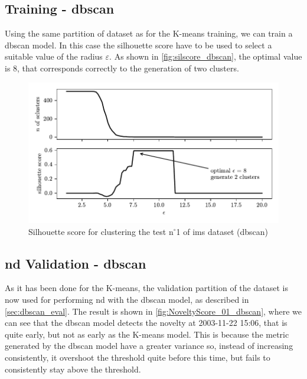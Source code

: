 \subsection{Training - \gls{dbscan}}
Using the same partition of dataset as for the K-means training, we can train a \gls{dbscan} model. In this case the silhouette score have to be used to select a suitable value of the radius $\varepsilon$. As shown in \autoref{fig:silscore_dbscan}, the optimal value is 8, that corresponds correctly to the generation of two clusters.

\begin{figure}
    \centering
    \includegraphics{images/IMS/InertiaScore_01_dbscan.pdf}
    \caption{Silhouette score for clustering the test $\text{n}^\circ$1 of \gls{ims} dataset (\gls{dbscan})}
    \label{fig:silscore_dbscan}
\end{figure}

\subsection{\gls{nd} Validation - \gls{dbscan}}
As it has been done for the K-means, the validation partition of the dataset is now used for performing \gls{nd} with the \gls{dbscan} model, as described in \autoref{sec:dbscan_eval}. The result is shown in \autoref{fig:NoveltyScore_01_dbscan}, where we can see that the \gls{dbscan} model detects the novelty at 2003-11-22 15:06, that is quite early, but not as early as the K-means model. This is because the metric generated by the \gls{dbscan} model have a greater variance so, instead of increasing consistently, it overshoot the threshold quite before this time, but fails to consistently stay above the threshold. 

